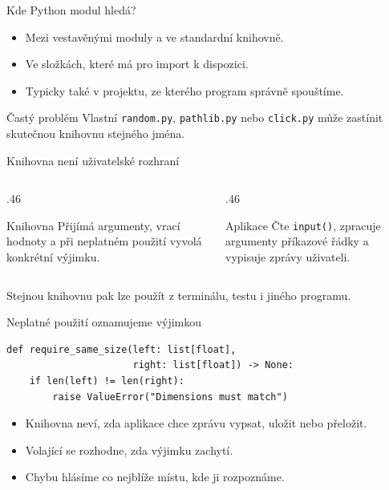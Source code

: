 \documentclass[aspectratio=169]{beamer}
\begin{document}
\begin{frame}{Kde Python modul hledá?}
  \begin{itemize}
    \item Mezi vestavěnými moduly a ve standardní knihovně.
    \item Ve složkách, které má pro import k dispozici.
    \item Typicky také v projektu, ze kterého program správně spouštíme.
  \end{itemize}
  \begin{block}{Častý problém}
    Vlastní \texttt{random.py}, \texttt{pathlib.py} nebo \texttt{click.py} může zastínit skutečnou knihovnu stejného jména.
  \end{block}
\end{frame}

\begin{frame}{Knihovna není uživatelské rozhraní}
  \begin{columns}[T]
    \begin{column}{.46\textwidth}
      \begin{block}{Knihovna}
        Přijímá argumenty, vrací hodnoty a při neplatném použití vyvolá konkrétní výjimku.
      \end{block}
    \end{column}
    \begin{column}{.46\textwidth}
      \begin{block}{Aplikace}
        Čte \texttt{input()}, zpracuje argumenty příkazové řádky a vypisuje zprávy uživateli.
      \end{block}
    \end{column}
  \end{columns}
  \vspace{4mm}
  Stejnou knihovnu pak lze použít z terminálu, testu i jiného programu.
\end{frame}

\begin{frame}[fragile]{Neplatné použití oznamujeme výjimkou}
\begin{lstlisting}[style=pythonSmall]
def require_same_size(left: list[float],
                      right: list[float]) -> None:
    if len(left) != len(right):
        raise ValueError("Dimensions must match")
\end{lstlisting}
  \begin{itemize}
    \item Knihovna neví, zda aplikace chce zprávu vypsat, uložit nebo přeložit.
    \item Volající se rozhodne, zda výjimku zachytí.
    \item Chybu hlásíme co nejblíže místu, kde ji rozpoznáme.
  \end{itemize}
\end{frame}
\end{document}
